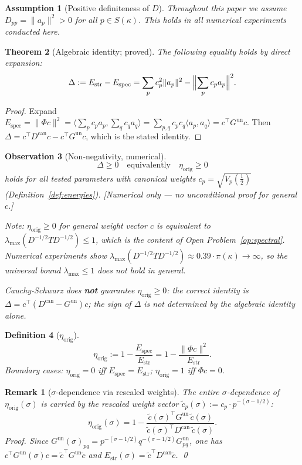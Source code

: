 \documentclass[11pt]{article}
\newtheorem{theorem}{Theorem}[section]
\newtheorem{definition}[theorem]{Definition}
\newtheorem{assumption}[theorem]{Assumption}
\newtheorem{observation}[theorem]{Observation}
\newtheorem*{remark}{Remark}
\newcommand{\Estr}{E_{\mathrm{str}}}
\newcommand{\Espec}{E_{\mathrm{spec}}}
\newcommand{\etaorig}{\eta_{\mathrm{orig}}}
\newcommand{\Gun}{G^{\mathrm{un}}}
\newcommand{\Dcan}{D^{\mathrm{can}}}
\begin{document}
\begin{assumption}[Positive definiteness of $D$]
Throughout this paper we assume $D_{pp}=\|a_p\|^2>0$ for all
$p\in S(\kappa)$. This holds in all numerical experiments conducted here.
\end{assumption}

\begin{theorem}[Algebraic identity; proved]
\label{thm:identity}
The following equality holds by direct expansion:
\[
\Delta:=\Estr-\Espec=\sum_p c_p^2\|a_p\|^2-\Bigl\|\sum_p c_p a_p\Bigr\|^2.
\]
\end{theorem}

\begin{proof}
Expand $\Espec=\|\Phi c\|^2=\bigl\langle\sum_p c_p a_p,\sum_q c_q
a_q\bigr\rangle=\sum_{p,q}c_p c_q\langle a_p,a_q\rangle=c^\top\Gun c$.
Then $\Delta=c^\top\Dcan c-c^\top\Gun c$, which is the stated identity.
\end{proof}

\begin{observation}[Non-negativity, numerical]
\label{obs:nonneg}
\[
\Delta\geq 0\quad\text{equivalently}\quad\etaorig\geq 0
\]
holds for all tested parameters with canonical weights
$c_p=\sqrt{V_p({\textstyle\frac12})}$ (Definition~\ref{def:energies}).
\emph{[Numerical only --- no unconditional proof for general $c$.]}

Note: $\etaorig\geq 0$ for general weight vector $c$ is equivalent to
$\lambda_{\max}(D^{-1/2}TD^{-1/2})\leq 1$, which is the content of
Open Problem~\ref{op:spectral}. Numerical experiments show
$\lambda_{\max}(D^{-1/2}TD^{-1/2})\approx 0.39\cdot\pi(\kappa)\to\infty$,
so the universal bound $\lambda_{\max}\leq 1$ does not hold in general.

\emph{Cauchy-Schwarz does \textbf{not} guarantee $\etaorig\geq 0$}: the
correct identity is $\Delta=c^\top(\Dcan-\Gun)c$; the sign of $\Delta$ is not
determined by the algebraic identity alone.
\end{observation}

\begin{definition}[$\etaorig$]
\label{def:eta}
\[
\etaorig:=1-\frac{\Espec}{\Estr}=1-\frac{\|\Phi c\|^2}{\Estr}.
\]
Boundary cases: $\etaorig=0$ iff $\Espec=\Estr$; $\etaorig=1$ iff $\Phi c=0$.
\end{definition}

\begin{remark}[$\sigma$-dependence via rescaled weights]
The entire $\sigma$-dependence of $\etaorig(\sigma)$ is carried by the
rescaled weight vector $\tilde{c}_p(\sigma):=c_p\cdot p^{-(\sigma-1/2)}$:
\[
\etaorig(\sigma)=1-\frac{\tilde{c}(\sigma)^\top\Gun\,\tilde{c}(\sigma)}
{\tilde{c}(\sigma)^\top\Dcan\,\tilde{c}(\sigma)}.
\]
\emph{Proof.} Since $\Gun(\sigma)_{pq}=p^{-(\sigma-1/2)}q^{-(\sigma-1/2)}\Gun_{pq}$,
one has $c^\top\Gun(\sigma)c=\tilde{c}^\top\Gun\tilde{c}$ and
$\Estr(\sigma)=\tilde{c}^\top\Dcan\tilde{c}$. \qed
\end{remark}
\end{document}
